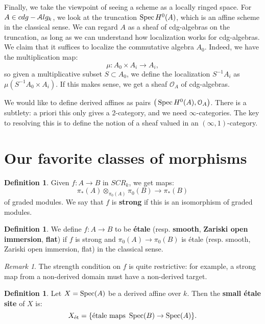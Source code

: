 \documentclass[10pt,a4paper,reqno,oneside]{book} %
\theoremstyle{plain}
\theoremstyle{definition}
\newtheorem{defin}[thm]{Definition}
\theoremstyle{remark}
\newtheorem{rem}[thm]{Remark}
\numberwithin{equation}{section}
\begin{document}
Finally, we take the viewpoint of seeing a scheme as a locally ringed space. For $A \in cdg-\mathcal A lg_k$, we look at
the truncation $\operatorname{Spec} H^0(A)$, which is an affine scheme in the classical sense. We can regard $A$ 
as a sheaf of cdg-algebras on the truncation, as long as we can understand how localization works for cdg-algebras. 
We claim that it suffices to localize the commutative algebra $A_0$. Indeed, we have the multiplication map:
\[	\mu:	A_0 \times A_i \to A_i,		\]
so given a multiplicative subset $S \subset A_0$, we define the localization $S^{-1}A_i$ as $\mu(S^{-1}A_0 \times A_i)$.
If this makes sense, we get a sheaf $\mathcal{O}_A$ of cdg-algebras.

We would like to define derived affines as pairs $\big(\operatorname{Spec} H^0(A), \mathcal{O}_A\big)$. There is a subtlety: a priori 
this only gives a 2-category, and we need $\infty$-categories.  The key to resolving this is to define the notion of a sheaf valued in an $(\infty,1)$-category.



\section{Our favorite classes of morphisms}
\begin{defin}
Given $f: A \to B$ in $SCR_k$, we get maps:
\[	\pi_*(A) \otimes_{\pi_0(A)} \pi_0(B) \to \pi_*(B)	\]
of graded modules. We say that $f$ is \textbf{strong} if this is an isomorphism of graded modules.
\end{defin}

\begin{defin}
\label{def:fav_morphisms}
We define $f: A \to B$ to be \textbf{\'{e}tale} (resp. \textbf{smooth}, \textbf{Zariski open immersion}, \textbf{flat})
if $f$ is strong and $\pi_0(A) \to \pi_0(B)$ is \'{e}tale (resp. smooth, Zariski open immersion, flat) in the classical sense.
\end{defin}

\begin{rem}
The strength condition on $f$ is quite restrictive: for example, a strong map from a non-derived domain must have a non-derived
target.
\end{rem}

\begin{defin}
Let $X = \operatorname{Spec}(A)$ be a derived affine over $k$. Then the \textbf{small \'{e}tale site} of $X$ is:
\[	X_{\text{\'{e}t}} = \{\text{\'{e}tale maps }\operatorname{Spec}(B) \to \operatorname{Spec}(A)\}.	\]
\end{defin}
\end{document}
